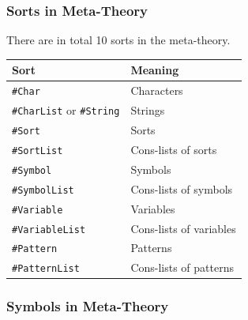 \documentclass[UTF8,11pt]{article}
\theoremstyle{plain}
\theoremstyle{definition}
\theoremstyle{remark}
\newcommand{\sharpsymbol}{\#}
\newcommand{\KChar}{\texttt{\sharpsymbol Char}}
\newcommand{\KCharList}{\texttt{\sharpsymbol CharList}}
\newcommand{\KString}{\texttt{\sharpsymbol String}}
\newcommand{\KSort}{\texttt{\sharpsymbol Sort}}
\newcommand{\KSymbol}{\texttt{\sharpsymbol Symbol}}
\newcommand{\KPatternList}{\texttt{\sharpsymbol PatternList}}
\newcommand{\KSortList}{\texttt{\sharpsymbol SortList}}
\newcommand{\KSymbolList}{\texttt{\sharpsymbol SymbolList}}
\newcommand{\KVariableList}{\texttt{\sharpsymbol VariableList}\xspace}
\newcommand{\KVariable}{\texttt{\sharpsymbol Variable}}
\newcommand{\KPattern}{\texttt{\sharpsymbol Pattern}}
\begin{document}
\subsubsection{Sorts in Meta-Theory}
There are in total 10 sorts in the meta-theory.
\begin{center}
 \begin{tabular}{l|l}
  \textbf{Sort} & \textbf{Meaning} \\
  \hline
  \KChar & Characters \\
  {\KCharList} or \KString & Strings \\
  \KSort & Sorts \\
  \KSortList & Cons-lists of sorts \\
  \KSymbol & Symbols \\
  \KSymbolList & Cons-lists of symbols \\
  \KVariable & Variables \\
  \KVariableList & Cons-lists of variables \\
  \KPattern & Patterns \\
  \KPatternList & Cons-lists of patterns \\
 \end{tabular}
\end{center}

\subsubsection{Symbols in Meta-Theory}
\end{document}
